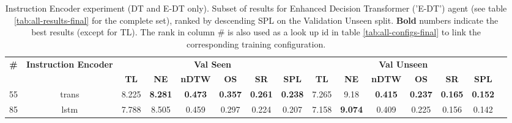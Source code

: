 \begin{table}
\centering
\caption{\label{tab:e_dt_instruction_encoding}Instruction Encoder experiment (DT and E-DT only). Subset of results for Enhanced Decision Transformer ('E-DT') agent (see table \ref{tab:all-results-final} for the complete set), ranked by descending SPL on the Validation Unseen split. \textbf{Bold} numbers indicate the best results (except for TL). The rank in column \# is also used as a look up id in table \ref{tab:all-configs-final} to link the corresponding training configuration.}
\begin{tabular}{@{\hskip3pt}c@{\hskip3pt}c@{\hskip3pt}c@{\hskip3pt}c@{\hskip3pt}c@{\hskip3pt}c@{\hskip3pt}c@{\hskip3pt}c@{\hskip3pt}c@{\hskip3pt}c@{\hskip3pt}c@{\hskip3pt}c@{\hskip3pt}c@{\hskip3pt}c@{\hskip3pt}c}
\toprule
                                  \textbf{\#} & \textbf{Instruction Encoder} & \multicolumn{6}{c}{\textbf{Val Seen}} & \multicolumn{6}{c}{\textbf{Val Unseen}} \\
\cmidrule(l){3-8}\cmidrule(l){9-14}\textbf{~} &                   \textbf{~} &       \textbf{TL} &     \textbf{NE} &   \textbf{nDTW} &     \textbf{OS} &     \textbf{SR} &    \textbf{SPL} &         \textbf{TL} &     \textbf{NE} &   \textbf{nDTW} &     \textbf{OS} &     \textbf{SR} &    \textbf{SPL} \\
\midrule
                                           55 &                        trans &             8.225 &  \textbf{8.281} &  \textbf{0.473} &  \textbf{0.357} &  \textbf{0.261} &  \textbf{0.238} &               7.265 &            9.18 &  \textbf{0.415} &  \textbf{0.237} &  \textbf{0.165} &  \textbf{0.152} \\
                                           85 &                         lstm &             7.788 &           8.505 &           0.459 &           0.297 &           0.224 &           0.207 &               7.158 &  \textbf{9.074} &           0.409 &           0.225 &           0.156 &           0.142 \\
\bottomrule
\end{tabular}
\end{table}
